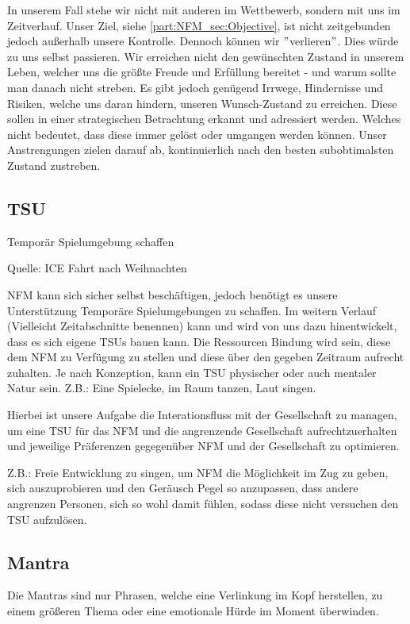 In unserem Fall stehe wir nicht mit anderen im Wettbewerb, sondern mit uns im Zeitverlauf. Unser Ziel, siehe \ref{part:NFM_sec:Objective}, ist nicht zeitgebunden jedoch außerhalb unsere Kontrolle. Dennoch können wir $"$verlieren$"$. Dies würde zu uns selbst passieren. Wir erreichen nicht den gewünschten Zustand in unserem Leben, welcher uns die größte Freude und Erfüllung bereitet - und warum sollte man danach nicht streben. Es gibt jedoch genügend Irrwege, Hindernisse und Risiken, welche uns daran hindern, unseren Wunsch-Zustand zu erreichen. Diese sollen in einer strategischen Betrachtung erkannt und adressiert werden. Welches nicht bedeutet, dass diese immer gelöst oder umgangen werden können. Unser Anstrengungen zielen darauf ab, kontinuierlich nach den besten subobtimalsten Zustand zustreben.\\

\subsection{TSU}

Temporär Spielumgebung schaffen

Quelle: ICE Fahrt nach Weihnachten

NFM kann sich sicher selbst beschäftigen, jedoch benötigt es unsere Unterstützung Temporäre Spielumgebungen zu schaffen. Im weitern Verlauf (Vielleicht Zeitabschnitte benennen) kann und wird von uns dazu hinentwickelt, dass es sich eigene TSUs bauen kann. Die Ressourcen Bindung wird sein, diese dem NFM zu Verfügung zu stellen und diese über den gegeben Zeitraum aufrecht zuhalten. Je nach Konzeption, kann ein TSU physischer oder auch mentaler Natur sein. Z.B.: Eine Spielecke, im Raum tanzen, Laut singen. 

Hierbei ist unsere Aufgabe die Interationsfluss mit der Gesellschaft zu managen, um eine TSU für das NFM und die angrenzende Gesellschaft aufrechtzuerhalten und jeweilige Präferenzen gegegenüber NFM und der Gesellschaft zu optimieren.

Z.B.: Freie Entwicklung zu singen, um NFM die Möglichkeit im Zug zu geben, sich auszuprobieren und den Geräusch Pegel so anzupassen, dass andere angrenzen Personen, sich so wohl damit fühlen, sodass diese nicht versuchen den TSU aufzulösen.

\subsection{Mantra}
Die Mantras sind nur Phrasen, welche eine Verlinkung im Kopf herstellen, zu einem größeren Thema oder eine emotionale Hürde im Moment überwinden.


